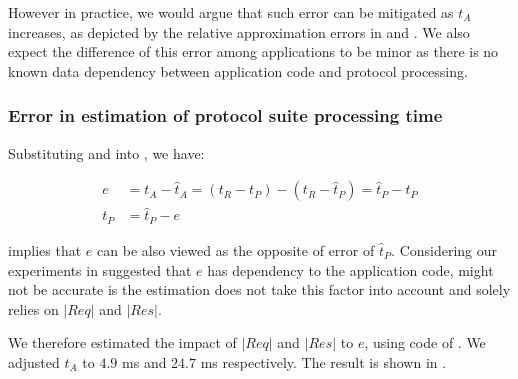 However in practice, we would argue that such error can be mitigated as $t_A$ increases, as depicted by the relative approximation errors in  and . We also expect the difference of this error among applications to be minor as there is no known data dependency between application code and protocol processing.

\subsubsection{Error in estimation of protocol suite processing time}

Substituting  and  into , we have:

\begin{equation}\label{Eq: tP error}
	\begin{aligned}
		e &= t_A - \hat{t}_A = (t_R - t_P) - (t_R - \hat{t}_P) = \hat{t}_P - t_P\\
		t_P &= \hat{t}_P - e
	\end{aligned}
\end{equation}

 implies that $e$ can be also viewed as the opposite of error of $\hat{t}_P$. Considering our experiments in  suggested that $e$ has dependency to the application code,  might not be accurate is the estimation does not take this factor into account and solely relies on $|Req|$ and $|Res|$. 

We therefore estimated the impact of $|Req|$ and $|Res|$ to $e$, using code of . We adjusted $t_A$ to $4.9$ ms and $24.7$ ms respectively. The result is shown in .

